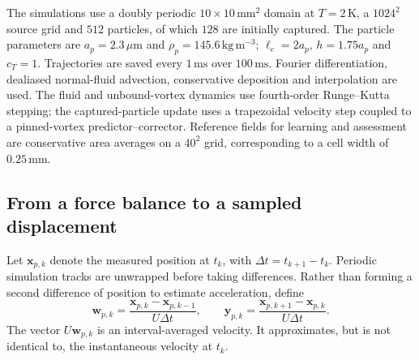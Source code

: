 \documentclass[11pt]{article}
\numberwithin{equation}{section}
\begin{document}
The simulations use a doubly periodic $10\times10\,\mathrm{mm}^2$ domain at $T=2\,\mathrm K$, a $1024^2$ source grid and $512$ particles, of which $128$ are initially captured. The particle parameters are $a_p=2.3\,\mu\mathrm m$ and $\rho_p=145.6\,\mathrm{kg\,m^{-3}}$; $\ell_e=2a_p$, $h=1.75a_p$ and $c_T=1$. Trajectories are saved every $1\,\mathrm{ms}$ over $100\,\mathrm{ms}$. Fourier differentiation, dealiased normal-fluid advection, conservative deposition and interpolation are used. The fluid and unbound-vortex dynamics use fourth-order Runge--Kutta stepping; the captured-particle update uses a trapezoidal velocity step coupled to a pinned-vortex predictor--corrector. Reference fields for learning and assessment are conservative area averages on a $40^2$ grid, corresponding to a cell width of $0.25\,\mathrm{mm}$.

\subsection{From a force balance to a sampled displacement}
\label{sec:sampledresponse}

Let $\mathbf x_{p,k}$ denote the measured position at $t_k$, with $\Delta t=t_{k+1}-t_k$. Periodic simulation tracks are unwrapped before taking differences. Rather than forming a second difference of position to estimate acceleration, define
\begin{equation}
 \mathbf w_{p,k}=\frac{\mathbf x_{p,k}-\mathbf x_{p,k-1}}{U\Delta t},
 \qquad
 \mathbf y_{p,k}=\frac{\mathbf x_{p,k+1}-\mathbf x_{p,k}}{U\Delta t}.
 \label{eq:observeddisplacements}
\end{equation}
The vector $U\mathbf w_{p,k}$ is an interval-averaged velocity. It approximates, but is not identical to, the instantaneous velocity at $t_k$.
\end{document}
